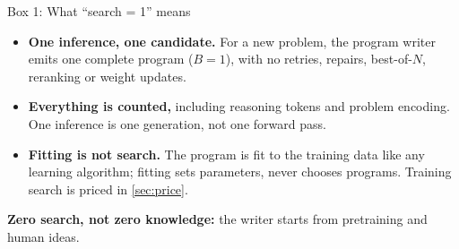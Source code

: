 \begin{explainer}{Box 1: What ``search = 1'' means}
\label{box:searchone}%
\begin{itemize}[leftmargin=*,nosep]
  \item \textbf{One inference, one candidate.} For a new problem, the program
    writer emits one complete program ($B = 1$), with no retries, repairs,
    best-of-$N$, reranking or weight updates.
  \item \textbf{Everything is counted,} including reasoning tokens and problem
    encoding. One inference is one generation, not one forward pass.
  \item \textbf{Fitting is not search.} The program is fit to the training
    data like any learning algorithm; fitting sets parameters, never chooses
    programs. Training search is priced in \cref{sec:price}.
\end{itemize}
\textbf{Zero search, not zero knowledge:} the writer starts from pretraining and
human ideas.
\end{explainer}

